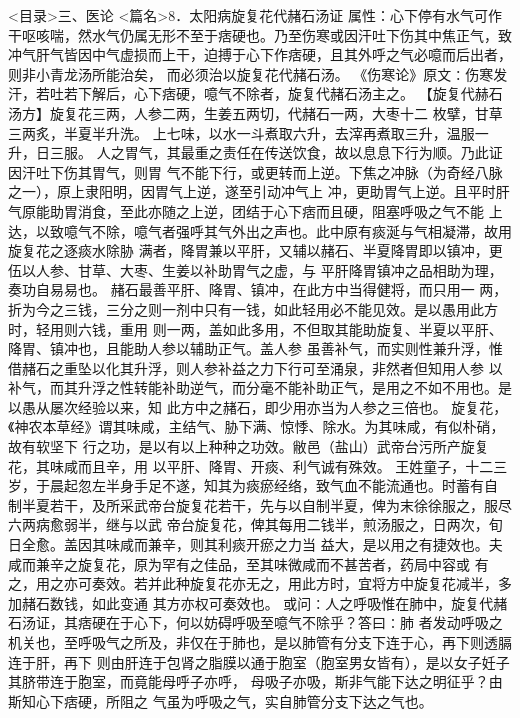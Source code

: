 \documentclass[a4paper,12pt,UTF8,twoside]{ctexbook}
\begin{document}
<目录>三、医论
<篇名>8．太阳病旋复花代赭石汤证
属性：心下停有水气可作干呕咳喘，然水气仍属无形不至于痞硬也。乃至伤寒或因汗吐下伤其中焦正气，致 
冲气肝气皆因中气虚损而上干，迫搏于心下作痞硬，且其外呼之气必噫而后出者，则非小青龙汤所能治矣， 
而必须治以旋复花代赭石汤。 
《伤寒论》原文∶伤寒发汗，若吐若下解后，心下痞硬，噫气不除者，旋复代赭石汤主之。 
【旋复代赫石汤方】旋复花三两，人参二两，生姜五两切，代赭石一两，大枣十二 
枚擘，甘草三两炙，半夏半升洗。 
上七味，以水一斗煮取六升，去滓再煮取三升，温服一升，日三服。 
人之胃气，其最重之责任在传送饮食，故以息息下行为顺。乃此证因汗吐下伤其胃气，则胃 
气不能下行，或更转而上逆。下焦之冲脉（为奇经八脉之一），原上隶阳明，因胃气上逆，遂至引动冲气上 
冲，更助胃气上逆。且平时肝气原能助胃消食，至此亦随之上逆，团结于心下痞而且硬，阻塞呼吸之气不能 
上达，以致噫气不除，噫气者强呼其气外出之声也。此中原有痰涎与气相凝滞，故用旋复花之逐痰水除胁 
满者，降胃兼以平肝，又辅以赭石、半夏降胃即以镇冲，更伍以人参、甘草、大枣、生姜以补助胃气之虚，与 
平肝降胃镇冲之品相助为理，奏功自易易也。 
赭石最善平肝、降胃、镇冲，在此方中当得健将，而只用一 
两，折为今之三钱，三分之则一剂中只有一钱，如此轻用必不能见效。是以愚用此方时，轻用则六钱，重用 
则一两，盖如此多用，不但取其能助旋复、半夏以平肝、降胃、镇冲也，且能助人参以辅助正气。盖人参 
虽善补气，而实则性兼升浮，惟借赭石之重坠以化其升浮，则人参补益之力下行可至涌泉，非然者但知用人参 
以补气，而其升浮之性转能补助逆气，而分毫不能补助正气，是用之不如不用也。是以愚从屡次经验以来，知 
此方中之赭石，即少用亦当为人参之三倍也。 
旋复花，《神农本草经》谓其味咸，主结气、胁下满、惊悸、除水。为其味咸，有似朴硝，故有软坚下 
行之功，是以有以上种种之功效。敝邑（盐山）武帝台污所产旋复花，其味咸而且辛，用 
以平肝、降胃、开痰、利气诚有殊效。 
王姓童子，十二三岁，于晨起忽左半身手足不遂，知其为痰瘀经络，致气血不能流通也。时蓄有自 
制半夏若干，及所采武帝台旋复花若干，先与以自制半夏，俾为末徐徐服之，服尽六两病愈弱半，继与以武 
帝台旋复花，俾其每用二钱半，煎汤服之，日两次，旬日全愈。盖因其味咸而兼辛，则其利痰开瘀之力当 
益大，是以用之有捷效也。夫咸而兼辛之旋复花，原为罕有之佳品，至其味微咸而不甚苦者，药局中容或 
有之，用之亦可奏效。若并此种旋复花亦无之，用此方时，宜将方中旋复花减半，多加赭石数钱，如此变通 
其方亦权可奏效也。 
或问∶人之呼吸惟在肺中，旋复代赭石汤证，其痞硬在于心下，何以妨碍呼吸至噫气不除乎？答曰∶肺 
者发动呼吸之机关也，至呼吸气之所及，非仅在于肺也，是以肺管有分支下连于心，再下则透膈连于肝，再下 
则由肝连于包肾之脂膜以通于胞室（胞室男女皆有），是以女子妊子其脐带连于胞室，而竟能母呼子亦呼， 
母吸子亦吸，斯非气能下达之明征乎？由斯知心下痞硬，所阻之 
气虽为呼吸之气，实自肺管分支下达之气也。 
\end{document}

